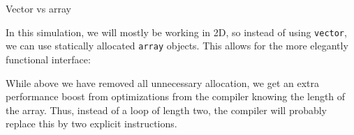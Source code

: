  {Vector vs array}

In this simulation, we will mostly be working in 2D,
so instead of using \lstinline{vector},
we can use statically allocated \lstinline{array} objects.
This allows for the more elegantly functional interface:
%

While above we have removed all unnecessary allocation,
we get an extra performance boost from optimizations
from the compiler knowing the length of the array.
Thus, instead of a loop of length two,
the compiler will probably replace this by
two explicit instructions.

